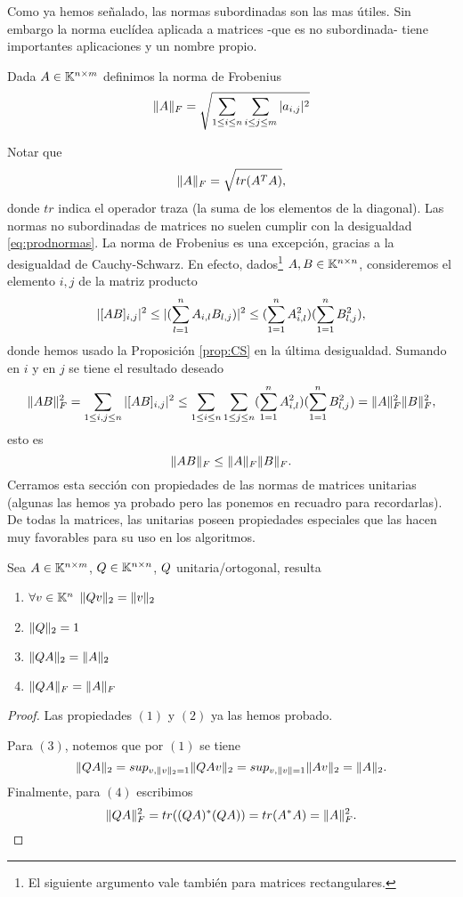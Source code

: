 Como ya hemos señalado, las normas subordinadas son las mas útiles. Sin embargo la norma euclídea aplicada a matrices -que es no subordinada- tiene importantes aplicaciones y un nombre propio.
\tccdefi
\begin{defi}
 Dada $\Ab\in \K^{n\times m}$ definimos la norma de Frobenius
 $$
 \|\Ab\|_F=\sqrt{\sum_{1\le i\le n}\sum_{i\le j\le m} |a_{i,j}|^2}
 $$
\end{defi}
\etcc
Notar que
$$
\|\Ab\|_F=\sqrt{tr(\Ab^T\Ab)},
$$
donde $tr$ indica el operador traza (la suma de los elementos de la diagonal). Las normas no subordinadas de matrices no suelen cumplir con la desigualdad \eqref{eq:prodnormas}. La norma de Frobenius es una excepción, gracias a la desigualdad de Cauchy-Schwarz. En efecto, dados\footnote{El siguiente argumento vale también para matrices rectangulares.}
$\Ab,\Bb\in \Knn$, consideremos el elemento $i,j$ de la  matriz producto
$$
|[\Ab\Bb]_{i,j}|^2\le |(\sum_{l=1}^n\Ab_{i,l}\Bb_{l,j})|^2\le (\sum_{1=1}^n\Ab_{i,l}^2)(\sum_{1=1}^n\Bb_{l,j}^2),
$$
donde hemos usado la Proposición \ref{prop:CS} en la última desigualdad. Sumando en $i$ y en $j$ se tiene el resultado deseado
$$
\|\Ab\Bb\|_F^2=\sum_{1\le i,j\le n}|[\Ab\Bb]_{i,j}|^2\le\sum_{1\le i\le n}\sum_{1\le j\le n}(\sum_{1=1}^n\Ab_{i,l}^2)(\sum_{1=1}^n\Bb_{l,j}^2)=
\|\Ab\|_F^2\|\Bb\|_F^2,
$$
esto es
\tcc
$$\|\Ab\Bb\|_F\le \|\Ab\|_F\|\Bb\|_F.$$
\etcc
Cerramos esta sección con propiedades de las normas de matrices unitarias (algunas las hemos ya probado pero las ponemos en recuadro para recordarlas).
De todas la matrices, las unitarias poseen propiedades especiales que las hacen muy favorables para su uso en los algoritmos.
\tcc
\begin{prop}
 \label{prop:unitarias}
 Sea $\Ab\in \K^{n\times m}$, $\Qb\in \Knn$, $\Qb$ unitaria/ortogonal, resulta
 \begin{enumerate}
  \item $\forall \vb\in \Kn$
  $\|\Qb\vb\|_{2}=\|\vb\|_2$
  \item $\|\Qb\|_{2}=1$
  \item $\|\Qb\Ab\|_2=\|\Ab\|_2$
  \item $\|\Qb\Ab\|_F=\|\Ab\|_F$
 \end{enumerate}
\end{prop}
\etcc
\begin{proof} Las propiedades $(1)$ y $(2)$ ya las hemos probado.

Para $(3)$, notemos que por $(1)$ se tiene
 $$\|\Qb\Ab \|_{2}=sup_{\vb, \|\vb\|_2=1}
 \|\Qb\Ab \vb\|_{2}=sup_{\vb, \|\vb\|=1}\|\Ab\vb\|_2=\|\Ab\|_2.
 $$
 Finalmente, para $(4)$ escribimos
 $$
 \|\Qb\Ab\|_F^2=tr((\Qb\Ab)^*(\Qb\Ab))=tr(\Ab^*\Ab)=\|\Ab\|_F^2.
 $$\end{proof}


